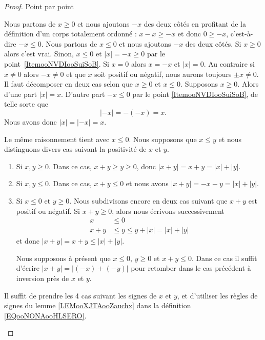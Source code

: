 \begin{proof}
	Point par point
	\begin{subproof}
		\spitem[\ref{ItemooNVDIooSuiSoB}]
		Nous partons de \( x\geq 0\) et nous ajoutons \( -x\) des deux côtés en profitant de la définition d'un corps totalement ordonné : \( x-x\geq -x\) et donc \( 0\geq-x\), c'est-à-dire \( -x\leq 0\).
		\spitem[\ref{ITEMooVNAZooSxmtuH}]
		Nous partons de \( x\leq 0\) et nous ajoutons \( -x\) des deux côtés.
		\spitem[\ref{ITEMooSDNHooDnjScE}]
		Si \( x\geq 0\) alors c'est vrai. Sinon, \( x\leq 0\) et \( | x |=-x\geq 0\) par le point~\ref{ItemooNVDIooSuiSoB}.
		\spitem[\ref{ITEMooLQLTooTJTPVM}]
		Si \( x=0\) alors \( x=-x\) et \( | x |=0\). Au contraire si \(x\neq 0\) alors \( -x\neq 0\) et que \( x\) soit positif ou négatif, nous aurons toujours \( \pm x\neq 0\).
		\spitem[\ref{ITEMooVJAEooOEatzY}]
		Il faut décomposer en deux cas selon que \( x\geq 0\) et \( x\leq 0\). Supposons \( x\geq 0\). Alors d'une part \( | x |=x\). D'autre part \( -x\leq 0\) par le point \ref{ItemooNVDIooSuiSoB}, de telle sorte que
		\begin{equation}
			| -x |=-(-x)=x.
		\end{equation}
		Nous avons donc \( | x |=| -x |=x\).

		Le même raisonnement tient avec \( x\leq 0\).
		\spitem[\ref{ItemooOMKNooRlanvk}]
		Nous supposons que \( x\leq y\) et nous distinguons divers cas suivant la positivité de \( x\) et \( y\).
		\begin{enumerate}
			\item
			      Si \( x,y\geq 0\). Dans ce cas, \( x+y\geq y\geq 0\), donc \( | x+y |=x+y=| x |+| y |\).
			\item
			      Si \( x,y\leq 0\). Dans ce cas, \( x+y\leq 0\) et nous avons \( | x+y |=-x-y=| x |+| y |\).
			\item
			      Si \( x\leq 0\) et \( y\geq 0\). Nous subdivisons encore en deux cas suivant que \( x+y\) est positif ou négatif. Si \( x+y\geq 0\), alors nous écrivons successivement
			      \begin{subequations}
				      \begin{align}
					      x   & \leq 0                         \\
					      x+y & \leq y\leq y+| x |=| x |+| y |
				      \end{align}
			      \end{subequations}
			      et donc \( | x+y |=x+y\leq | x |+| y |\).

			      Nous supposons à présent que \( x\leq 0\), \( y\geq 0\) et \( x+y\leq 0\). Dans ce cas il suffit d'écrire \( | x+y |=| (-x)+(-y) |\) pour retomber dans le cas précédent à inversion près de \( x\) et \( y\).
		\end{enumerate}
		Il suffit de prendre les 4 cas suivant les signes de \( x\) et \( y\), et d'utiliser les règles de signes du lemme \ref{LEMooXJTAooZauchx} dans la définition \ref{EQooNONAooHLSERO}.
	\end{subproof}
\end{proof}

